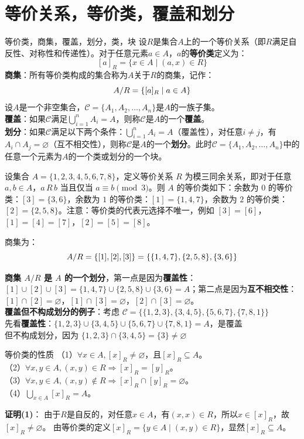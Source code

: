 \section{等价关系，等价类，覆盖和划分}
\begin{definition}{等价类，商集，覆盖，划分，类，块}{}
设$R$是集合$A$上的一个等价关系（即$R$满足自反性、对称性和传递性）。对于任意元素$a \in A$，$a$的\textbf{等价类}定义为：\vspace{-10pt}
\[
[a]_R = \{x \in A \mid (a,x) \in R\}
\]
\textbf{商集}：所有等价类构成的集合称为$A$关于$R$的商集，记作：\vspace{-5pt}
\[
A/R = \{[a]_R \mid a \in A\}\vspace{-5pt}
\]
设$A$是一个非空集合，$\mathcal{C} = \{A_1, A_2, \ldots, A_n\}$是$A$的一族子集。\\
\textbf{覆盖}：如果$\mathcal{C}$满足$\bigcup_{i=1}^{n} A_i = A$，则称$\mathcal{C}$是$A$的一个\textbf{覆盖}。\\
\textbf{划分}：如果$\mathcal{C}$满足以下两个条件：$\bigcup_{i=1}^{n} A_i = A$（覆盖性），对任意$i \neq j$，有$A_i \cap A_j = \varnothing$（互不相交性），则称$\mathcal{C}$是$A$的一个\textbf{划分}。此时$\mathcal{C} = \{A_1, A_2, \ldots, A_n\}$中的任意一个元素为$A$的一个类或划分的一个块。
\end{definition}
设集合 $A = \{1, 2, 3, 4, 5, 6, 7, 8\}$，定义等价关系 $R$ 为模三同余关系，即对于任意 $a, b \in A$，$a \, R \, b$ 当且仅当 $a \equiv b \pmod{3}$。则 $A$ 的等价类如下：余数为 $0$ 的等价类：$[3] = \{3, 6\}$，余数为 $1$ 的等价类：$[1] = \{1, 4, 7\}$，余数为 $2$ 的等价类：$[2] = \{2, 5, 8\}$。注意：等价类的代表元选择不唯一，例如 $[3] = [6]$，$[1] = [4] = [7]$，$[2] = [5] = [8]$。

商集为：\vspace{-5pt}
\[
A/R = \{[1], [2], [3]\} = \{\{1,4,7\}, \{2,5,8\}, \{3,6\}\}\vspace{-5pt}
\]

\textbf{商集 $A/R$ 是 $A$ 的一个划分}，第一点是因为\textbf{覆盖性}：$[1] \cup [2] \cup [3] = \{1,4,7\} \cup \{2,5,8\} \cup \{3,6\} = A$；第二点是因为\textbf{互不相交性}：$[1] \cap [2] = \varnothing$，$[1] \cap [3] = \varnothing$，$[2] \cap [3] = \varnothing$。\\
\textbf{覆盖但不构成划分的例子}：考虑 $\mathcal{C} = \{\{1,2,3\}, \{3,4,5\}, \{5,6,7\}, \{7,8,1\}\}$\\先看\textbf{覆盖性}：$\{1,2,3\} \cup \{3,4,5\} \cup \{5,6,7\} \cup \{7,8,1\} = A$，是覆盖
\\但不构成划分，因为 $\{1,2,3\} \cap \{3,4,5\} = \{3\} \neq \varnothing$
\begin{theorem}{等价类的性质}{}
（1）$\forall x\in A,[x]_R\ne\varnothing$，且$[x]_R\subseteq A$。\\
（2）$\forall x,y\in A,(x,y)\in R\Rightarrow [x]_R=[y]_R$。\\
（3）$\forall x,y\in A,(x,y)\notin R\Rightarrow [x]_R\cap[y]_R=\varnothing$。\\
（4）$\bigcup_{x\in A} [x]_R = A$。
\end{theorem}
\textbf{证明(1)}：
由于$R$是自反的，对任意$x \in A$，有$(x,x) \in R$，所以$x \in [x]_R$，故$[x]_R \neq \varnothing$。
由等价类的定义$[x]_R = \{y \in A \mid (x,y) \in R\}$，显然$[x]_R \subseteq A$。

